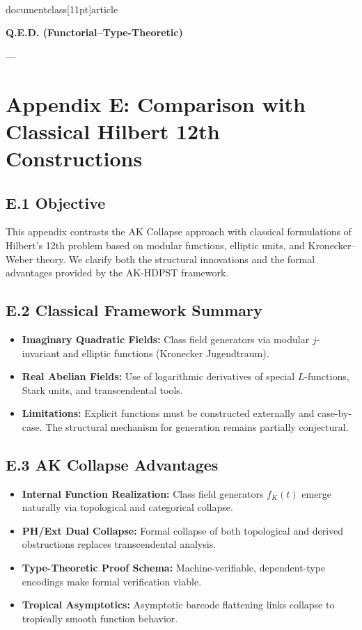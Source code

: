 \\documentclass[11pt]{article}
\begin{document}
\begin{center}
\LARGE \textbf{Q.E.D. (Functorial–Type-Theoretic)}
\end{center}


---


\section*{Appendix E: Comparison with Classical Hilbert 12th Constructions}

\subsection*{E.1 Objective}

This appendix contrasts the AK Collapse approach with classical formulations of Hilbert’s 12th problem  
based on modular functions, elliptic units, and Kronecker–Weber theory.  
We clarify both the structural innovations and the formal advantages provided by the AK-HDPST framework.

\subsection*{E.2 Classical Framework Summary}

\begin{itemize}
    \item \textbf{Imaginary Quadratic Fields:} Class field generators via modular \( j \)-invariant and elliptic functions (Kronecker Jugendtraum).
    \item \textbf{Real Abelian Fields:} Use of logarithmic derivatives of special \( L \)-functions, Stark units, and transcendental tools.
    \item \textbf{Limitations:} Explicit functions must be constructed externally and case-by-case. The structural mechanism for generation remains partially conjectural.
\end{itemize}

\subsection*{E.3 AK Collapse Advantages}

\begin{itemize}
    \item \textbf{Internal Function Realization:} Class field generators \( f_K(t) \) emerge naturally via topological and categorical collapse.
    \item \textbf{PH/Ext Dual Collapse:} Formal collapse of both topological and derived obstructions replaces transcendental analysis.
    \item \textbf{Type-Theoretic Proof Schema:} Machine-verifiable, dependent-type encodings make formal verification viable.
    \item \textbf{Tropical Asymptotics:} Asymptotic barcode flattening links collapse to tropically smooth function behavior.
\end{itemize}
\end{document}

